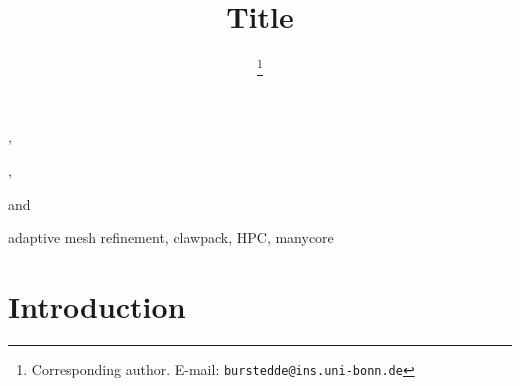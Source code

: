 \documentclass{IOS-Book-Article}     %
\begin{document}
\begin{frontmatter}          %
%
\title{Title}

\author[A]{ %
\thanks{Corresponding author.  E-mail: \texttt{burstedde@ins.uni-bonn.de}}},
\author[B]{ },
\author[C]{ } and
\author[C]{ }
\address[A]{Institut f\"ur Numerische Simulation, Universit\"at Bonn, Germany}
\address[B]{Boise State University, Idaho, USA}
\address[C]{Institute for Computational Engineering and Sciences,\\
The University of Texas at Austin, USA}
%
%


\begin{keyword}
adaptive mesh refinement,
clawpack,
HPC,
manycore
\end{keyword}

\end{frontmatter}

\cite{BursteddeWilcoxGhattas11}


\section*{Introduction}




\end{document}
